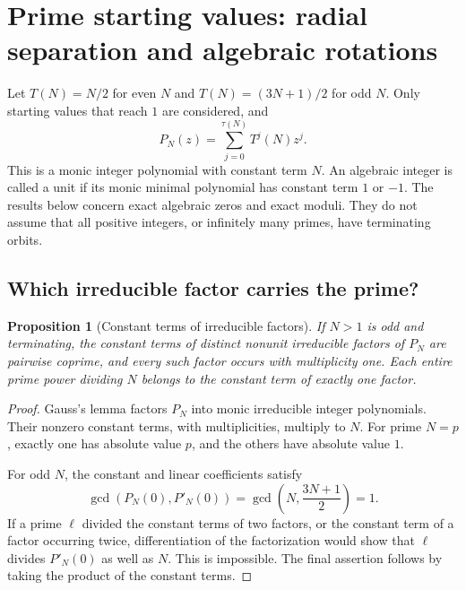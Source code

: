 \documentclass[11pt,a4paper]{article}
\newtheorem{proposition}[theorem]{Proposition}
\theoremstyle{definition}
\theoremstyle{remark}
\numberwithin{equation}{section}
\begin{document}


\section{Prime starting values: radial separation and algebraic rotations}
\label{C:sec:prime-radial-separation}

Let $T(N)=N/2$ for even $N$ and $T(N)=(3N+1)/2$ for odd $N$.
Only starting values that reach $1$ are considered, and
\[
 P_N(z)=\sum_{j=0}^{\tau(N)}T^j(N)z^j.
\]
This is a monic integer polynomial with constant term $N$.
An algebraic integer is called a unit if its monic minimal polynomial
has constant term $1$ or $-1$. The results below concern exact algebraic
zeros and exact moduli. They do not assume that all positive integers,
or infinitely many primes, have terminating orbits.

\subsection{Which irreducible factor carries the prime?}

\begin{proposition}[Constant terms of irreducible factors]
\label{C:prop:odd-factor-constants}
If $N>1$ is odd and terminating, the constant terms of
distinct nonunit irreducible factors of $P_N$ are pairwise coprime,
and every such factor occurs with multiplicity one. Each entire prime
power dividing $N$ belongs to the constant term of exactly one factor.
\end{proposition}

\begin{proof}
Gauss's lemma factors $P_N$ into monic irreducible integer polynomials.
Their nonzero constant terms, with multiplicities, multiply to $N$.
For prime $N=p$, exactly one has absolute value $p$, and the others
have absolute value $1$.

For odd $N$, the constant and linear coefficients satisfy
\[
 \gcd(P_N(0),P'_N(0))
 =\gcd\left(N,\frac{3N+1}{2}\right)=1.
\]
If a prime $\ell$ divided the constant terms of two factors, or the
constant term of a factor occurring twice, differentiation of the
factorization would show that $\ell$ divides $P'_N(0)$ as well as $N$.
This is impossible. The final assertion follows by taking the product
of the constant terms.
\end{proof}
\end{document}
